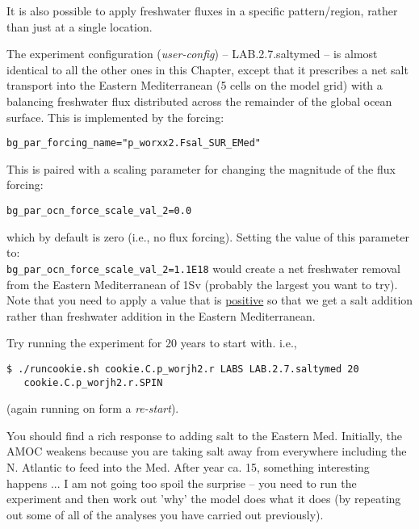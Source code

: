 \noindent It is also possible to apply freshwater fluxes in a specific pattern/region, rather than just at a single location.

The experiment configuration (\textit{user-config}) -- \textsf{\footnotesize LAB.2.7.saltymed} -- is almost identical to all the other ones in this Chapter, except that it prescribes a net salt transport into the Eastern Mediterranean (5 cells on the model grid) with a balancing freshwater flux distributed across the remainder of the global ocean surface. This is implemented by the forcing:

\vspace{-2mm}\small\begin{verbatim}
bg_par_forcing_name="p_worxx2.Fsal_SUR_EMed"
\end{verbatim}\normalsize\vspace{-2mm}

\noindent This is paired with a scaling parameter for changing the magnitude of the flux forcing:

\vspace{-2mm}\small\begin{verbatim}
bg_par_ocn_force_scale_val_2=0.0
\end{verbatim}\normalsize\vspace{-2mm}

\noindent which by default is zero (i.e., no flux forcing). Setting the value of this parameter to: \\\texttt{bg\_par\_ocn\_force\_scale\_val\_2=1.1E18} would create a net freshwater removal from the Eastern Mediterranean of 1Sv (probably the largest you want to try). Note that you need to apply a value that is \uline{positive} so that we get a salt addition rather than freshwater addition in the Eastern Mediterranean.

\newpage

Try running the experiment for 20 years to start with. i.e.,

\vspace{-2mm}\small\begin{verbatim}
$ ./runcookie.sh cookie.C.p_worjh2.r LABS LAB.2.7.saltymed 20 
   cookie.C.p_worjh2.r.SPIN
\end{verbatim}\normalsize\vspace{-2mm}

(again running on form a \textit{re-start}).

\vspace{1mm}
You should find a rich response to adding salt to the Eastern Med. Initially, the AMOC weakens because you are taking salt away from everywhere including the N. Atlantic to feed into the Med. After year ca. 15, something interesting happens ... I am not going too spoil the surprise -- you need to run the experiment and then work out 'why' the model does what it does (by repeating out some of all of the analyses you have carried out previously).


